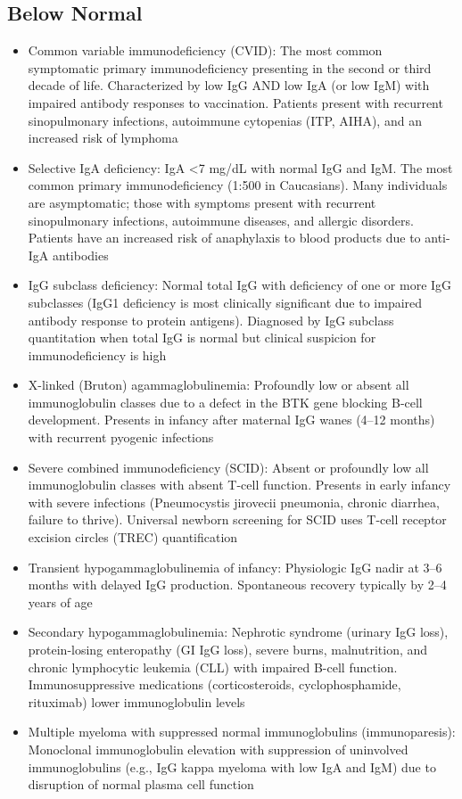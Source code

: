 \subsection*{Below Normal}
\begin{itemize}
  \item Common variable immunodeficiency (CVID): The most common symptomatic primary immunodeficiency presenting in the second or third decade of life. Characterized by low IgG AND low IgA (or low IgM) with impaired antibody responses to vaccination. Patients present with recurrent sinopulmonary infections, autoimmune cytopenias (ITP, AIHA), and an increased risk of lymphoma \cite{cunninghamrundles1999common}
  \item Selective IgA deficiency: IgA <7 mg/dL with normal IgG and IgM. The most common primary immunodeficiency (1:500 in Caucasians). Many individuals are asymptomatic; those with symptoms present with recurrent sinopulmonary infections, autoimmune diseases, and allergic disorders. Patients have an increased risk of anaphylaxis to blood products due to anti-IgA antibodies
  \item IgG subclass deficiency: Normal total IgG with deficiency of one or more IgG subclasses (IgG1 deficiency is most clinically significant due to impaired antibody response to protein antigens). Diagnosed by IgG subclass quantitation when total IgG is normal but clinical suspicion for immunodeficiency is high
  \item X-linked (Bruton) agammaglobulinemia: Profoundly low or absent all immunoglobulin classes due to a defect in the BTK gene blocking B-cell development. Presents in infancy after maternal IgG wanes (4--12 months) with recurrent pyogenic infections
  \item Severe combined immunodeficiency (SCID): Absent or profoundly low all immunoglobulin classes with absent T-cell function. Presents in early infancy with severe infections (Pneumocystis jirovecii pneumonia, chronic diarrhea, failure to thrive). Universal newborn screening for SCID uses T-cell receptor excision circles (TREC) quantification
  \item Transient hypogammaglobulinemia of infancy: Physiologic IgG nadir at 3--6 months with delayed IgG production. Spontaneous recovery typically by 2--4 years of age
  \item Secondary hypogammaglobulinemia: Nephrotic syndrome (urinary IgG loss), protein-losing enteropathy (GI IgG loss), severe burns, malnutrition, and chronic lymphocytic leukemia (CLL) with impaired B-cell function. Immunosuppressive medications (corticosteroids, cyclophosphamide, rituximab) lower immunoglobulin levels
  \item Multiple myeloma with suppressed normal immunoglobulins (immunoparesis): Monoclonal immunoglobulin elevation with suppression of uninvolved immunoglobulins (e.g., IgG kappa myeloma with low IgA and IgM) due to disruption of normal plasma cell function
\end{itemize}

